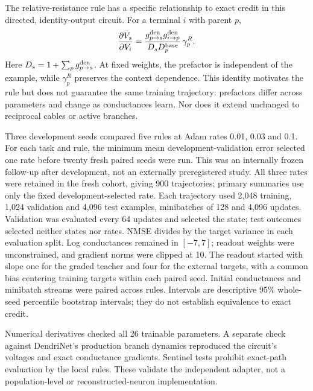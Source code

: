 The relative-resistance rule has a specific relationship to exact credit in
this directed, identity-output circuit. For a terminal $i$ with parent $p$,
\begin{equation}
\frac{\partial V_s}{\partial V_i}
=\frac{g_{p\to s}^{\rm den}g_{i\to p}^{\rm den}}
 {D_sD_p^{\rm base}}\,\gamma_p^{R}.
\end{equation}
Here $D_s=1+\sum_pg_{p\to s}^{\rm den}$. At fixed weights, the prefactor is
independent of the example, while $\gamma_p^R$ preserves the context dependence.
This identity motivates the rule but does not guarantee the same training
trajectory: prefactors differ across parameters and change as conductances
learn. Nor does it extend unchanged to reciprocal cables or active branches.

Three development seeds compared five rules at Adam rates 0.01, 0.03 and 0.1.
For each task and rule, the minimum mean development-validation error selected
one rate before twenty fresh paired seeds were run. This was an internally
frozen follow-up after development, not an externally preregistered study.
All three rates were retained in the fresh cohort, giving 900 trajectories;
primary summaries use only the fixed development-selected rate. Each trajectory
used 2,048 training, 1,024 validation and 4,096 test examples, minibatches of
128 and 4,096 updates. Validation was evaluated every 64 updates and selected
the state; test outcomes selected neither states nor rates. NMSE divides by
the target variance in each evaluation split. Log conductances remained in
$[-7,7]$; readout weights were unconstrained, and gradient norms were clipped
at 10. The readout started with slope one for the graded teacher and four for
the external targets, with a common bias centering training targets within
each paired seed. Initial conductances and minibatch streams were paired
across rules. Intervals are descriptive 95\% whole-seed percentile bootstrap
intervals; they do not establish equivalence to exact credit.

Numerical derivatives checked all 26 trainable parameters. A separate check
against DendriNet's production branch dynamics reproduced the circuit's
voltages and exact conductance gradients. Sentinel tests prohibit exact-path
evaluation by the local rules. These validate the independent adapter, not a
population-level or reconstructed-neuron implementation.

